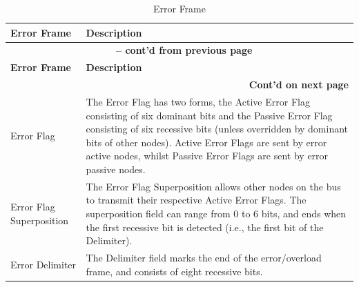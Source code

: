 \begin{longtable}[c]{|p{4cm}|p{11cm}|} 
    
  \caption{Error Frame}
  \label{tab:twai-error-frame} 
  \\\hline
  \rowcolor{lightgray}
  \textbf{Error Frame} & \textbf{Description}
  \\\hline
  \endfirsthead
  
  \multicolumn{2}{c}{\bfseries \tablename\ \thetable{} -- cont'd from previous page}\\  \hline
  
  \rowcolor{lightgray}
    \textbf{Error Frame} & \textbf{Description}
  \\\hline
  \endhead
  
  \multicolumn{2}{r}{\textbf{Cont'd on next page}} \\
  \endfoot
  \endlastfoot

    Error Flag & The Error Flag has two forms, the Active Error Flag consisting of six dominant bits and the Passive Error Flag consisting of six recessive bits (unless overridden by dominant bits of other nodes). Active Error Flags are sent by error active nodes, whilst Passive Error Flags are sent by error passive nodes.
          \\\hline
    Error Flag Superposition & The Error Flag Superposition allows other nodes on the bus to transmit their respective Active Error Flags. The superposition field can range from 0 to 6 bits, and ends when the first recessive bit is detected (i.e., the first bit of the Delimiter).           \\\hline
    Error Delimiter & The Delimiter field marks the end of the error/overload frame, and consists of eight recessive bits.                                                  
          \\\hline
\end{longtable}
